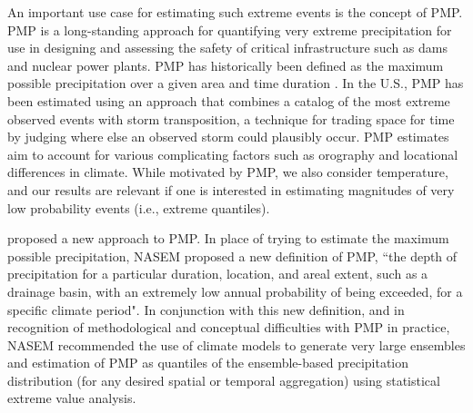 \documentclass{ametsocV6.1}
\begin{document}


An important use case for estimating such extreme events is the concept of PMP. PMP is a long-standing approach for quantifying very extreme precipitation for use in designing and assessing the safety of critical infrastructure such as dams and nuclear power plants. %
PMP has historically been defined as the maximum possible precipitation over a given area and time duration \citep{nasem2024pmp}.
In the U.S., PMP has been estimated using an approach that combines %
a catalog of the most extreme observed events with storm transposition, a technique for trading space for time by judging where else an observed storm could plausibly occur.
PMP estimates aim to account for various complicating factors such as orography and locational differences in climate. 
While motivated by PMP, we also consider temperature, and our results are relevant if one is interested in estimating magnitudes of very low probability events (i.e., extreme quantiles).

\cite{nasem2024pmp} proposed a new approach to PMP. 
In place of trying to estimate the maximum possible precipitation, NASEM proposed a new definition of PMP, ``the depth of precipitation for a particular duration, location, and areal extent, such as a drainage basin, with an extremely low annual probability of being exceeded, for a specific climate period".   
In conjunction with this new definition, and in recognition of methodological and conceptual difficulties with PMP in practice, NASEM recommended the use of climate models
to generate very large ensembles and estimation of PMP as quantiles of the ensemble-based precipitation distribution (for any desired spatial or temporal aggregation) using statistical extreme value analysis. 
\end{document}
